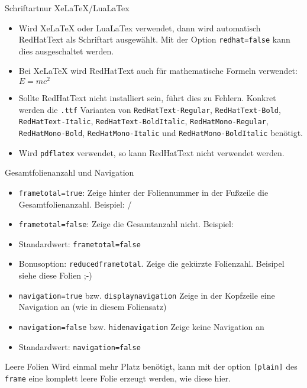 \documentclass[german,10pt,xcolor=colortbl,compress
]{beamer}
\begin{document}
\begin{frame}{Schriftart}{nur XeLaTeX/LuaLaTex}
	\begin{itemize}
		\item Wird XeLaTeX oder LuaLaTex verwendet, dann wird automatisch RedHatText als Schriftart ausgewählt. Mit der Option \lstinline!redhat=false! kann dies ausgeschaltet werden.
		\item Bei XeLaTeX wird RedHatText auch für mathematische Formeln verwendet: $E=mc^2$
		\item Sollte RedHatText nicht installiert sein, führt dies zu Fehlern. Konkret werden die \lstinline!.ttf! Varianten von \lstinline!RedHatText-Regular!, \lstinline!RedHatText-Bold!, \lstinline!RedHatText-Italic!, \lstinline!RedHatText-BoldItalic!, \lstinline!RedHatMono-Regular!, \lstinline!RedHatMono-Bold!, \lstinline!RedHatMono-Italic! und \lstinline!RedHatMono-BoldItalic! benötigt.
		\item Wird \lstinline!pdflatex! verwendet, so kann RedHatText nicht verwendet werden.
	\end{itemize}
\end{frame}
\begin{frame}{Gesamtfolienanzahl und Navigation}
	\begin{itemize}
		\item \lstinline|frametotal=true|: Zeige hinter der Foliennummer in der Fußzeile die Gesamtfolienanzahl. Beispiel: \insertframenumber{}/\inserttotalframenumber
		\item \lstinline|frametotal=false|: Zeige die Gesamtanzahl nicht. Beispiel: \insertframenumber{}
		\item Standardwert: \lstinline|frametotal=false|
		\item Bonusoption: \lstinline|reducedframetotal|. Zeige die gekürzte Folienzahl. Beisipel siehe diese Folien ;-)
	\end{itemize}
	\vspace{\baselineskip}
	\begin{itemize}
		\item \lstinline|navigation=true| bzw. \lstinline|displaynavigation| Zeige in der Kopfzeile eine Navigation an (wie in diesem Foliensatz)
		\item \lstinline|navigation=false| bzw. \lstinline|hidenavigation| Zeige keine Navigation an
		\item Standardwert: \lstinline|navigation=false|
	\end{itemize}
\end{frame}
\begin{frame}[plain]{Leere Folien}
	Wird einmal mehr Platz benötigt, kann mit der option \lstinline|[plain]| des \lstinline|frame| eine komplett leere Folie erzeugt werden, wie diese hier.
\end{frame}
\end{document}
